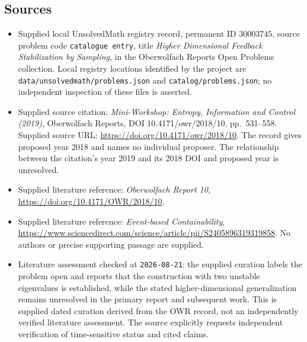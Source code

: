\documentclass[11pt]{article}
\begin{document}
\subsection{Sources}
\begin{itemize}
\item Supplied local UnsolvedMath registry record, permanent ID \(30003745\), source problem code \texttt{catalogue entry}, title \emph{Higher Dimensional Feedback Stabilization by Sampling}, in the Oberwolfach Reports Open Problems collection. Local registry locations identified by the project are \texttt{data/unsolvedmath/problems.json} and \texttt{catalog/problems.json}; no independent inspection of these files is asserted.
\item Supplied source citation: \emph{Mini-Workshop: Entropy, Information and Control (2019)}, Oberwolfach Reports, DOI 10.4171/owr/2018/10, pp.\ 531--558. Supplied source URL: \url{https://doi.org/10.4171/owr/2018/10}. The record gives proposed year 2018 and names no individual proposer. The relationship between the citation's year 2019 and its 2018 DOI and proposed year is unresolved.
\item Supplied literature reference: \emph{Oberwolfach Report 10}, \url{https://doi.org/10.4171/OWR/2018/10}.
\item Supplied literature reference: \emph{Event-based Containability}, \url{https://www.sciencedirect.com/science/article/pii/S2405896319319858}. No authors or precise supporting passage are supplied.
\item Literature assessment checked at \texttt{2026-08-21}: the supplied curation labels the problem open and reports that the construction with two unstable eigenvalues is established, while the stated higher-dimensional generalization remains unresolved in the primary report and subsequent work. This is supplied dated curation derived from the OWR record, not an independently verified literature assessment. The source explicitly requests independent verification of time-sensitive status and cited claims.
\end{itemize}
\end{document}
